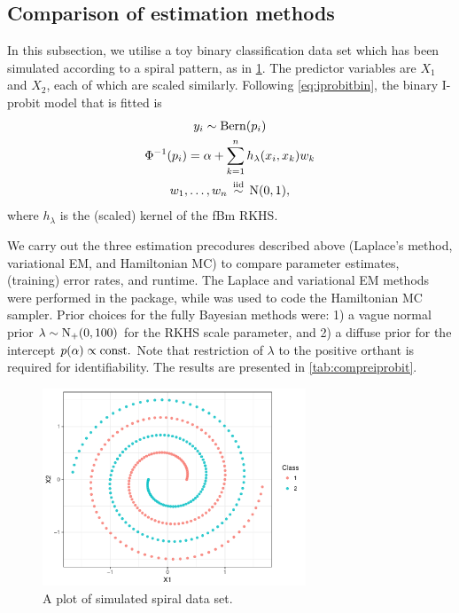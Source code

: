 \subsection{Comparison of estimation methods}

In this subsection, we utilise a toy binary classification data set which has been simulated according to a spiral pattern, as in \cref{fig:exampleiprobit}.
The predictor variables are $X_1$ and $X_2$, each of which are scaled similarly.
Following \cref{eq:iprobitbin}, the binary I-probit model that is fitted is
\begin{gather*}
  y_i \sim \operatorname{Bern}(p_i) \\
  \Phi^{-1}(p_i) = \alpha + \sum_{k=1}^n h_\lambda(x_i,x_k)w_k  \\
  w_1,\dots,w_n \,\overset{\text{iid}}{\sim}\, \operatorname{N}(0,1),
\end{gather*}
where $h_\lambda$ is the (scaled) kernel of the fBm RKHS.

We carry out the three estimation precodures described above (Laplace's method, variational EM, and Hamiltonian MC) to compare parameter estimates, (training) error rates, and runtime.
The Laplace and variational EM methods were performed in the  package, while  was used to code the Hamiltonian MC sampler.
Prior choices for the fully Bayesian methods were: 1) a vague normal prior $\lambda\sim\operatorname{N}_+(0,100)$ for the RKHS scale parameter, and 2) a diffuse prior for the intercept $p(\alpha) \propto \text{const.}\hspace{0.01em}$
Note that restriction of $\lambda$ to the positive orthant is required for identifiability.
The results are presented in \cref{tab:compreiprobit}.

\begin{figure}[hbt]
  \centering
  \includegraphics[width=0.7\textwidth]{figure/05-example_data}
  \caption{A plot of simulated spiral data set.}
  \vspace{-0.5em}
  \label{fig:exampleiprobit}
\end{figure}

